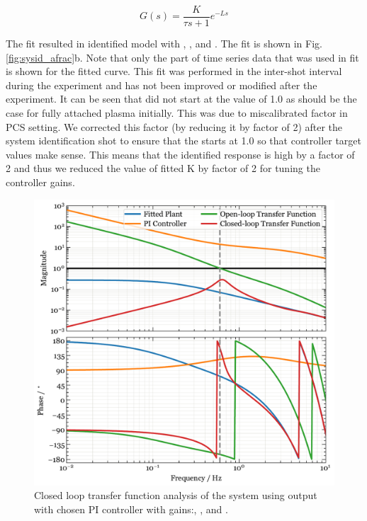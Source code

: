 \begin{equation}
    G(s) = \frac{K}{\tau s + 1}e^{-L s}
\label{eq:sysid}
\end{equation}

The fit resulted in identified model with \AfracK, \AfracTau, and \AfracL. The fit is shown in Fig.\ref{fig:sysid_afrac}b. Note that only the part of time series data that was used in fit is shown for the fitted curve. This fit was performed in the inter-shot interval during the experiment and has not been improved or modified after the experiment. It can be seen that \Afrac did not start at the value of 1.0 as should be the case for fully attached plasma initially. This was due to miscalibrated factor in PCS setting. We corrected this factor (by reducing it by factor of 2) after the system identification shot to ensure that the \Afrac starts at 1.0 so that controller target values make sense. This means that the identified response is high by a factor of 2 and thus we reduced the value of fitted K by factor of 2 for tuning the controller gains.

\begin{figure}[!ht]
 \centering
 \includegraphics[width=\linewidth]{figures/Afrac_LoopStability.pdf}
 \caption{Closed loop transfer function analysis of the system  using \Afrac output with chosen PI controller with gains:\AfracKp, \AfracTi, and \Afracstau.}
 \label{fig:cltf_afrac}
\end{figure}

